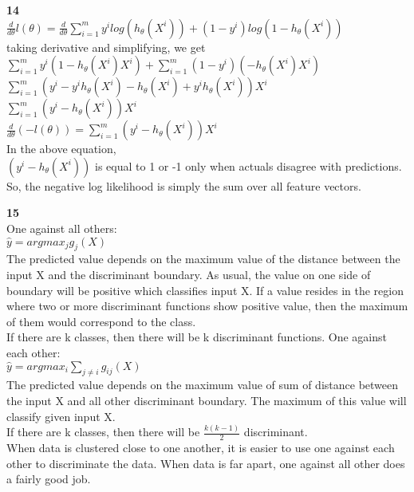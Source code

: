 \documentclass{article}
\begin{document}
\textbf{14}\bigskip \\
$\frac{d}{d\theta}l(\theta) = \frac{d}{d\theta}\sum_{i=1}^{m}y^{i}log(h_{\theta}(X^{i}))+(1-y^{i})log(1-h_{\theta}(X^{i}))$ \smallskip \\
taking derivative and simplifying, we get \smallskip \\
$\sum_{i=1}^{m}y^{i}(1-h_{\theta}(X^{i})X^{i})+\sum_{i=1}^{m}(1-y^{i})(-h_{\theta}(X^{i})X^{i})$\smallskip \\
$\sum_{i=1}^{m}(y^{i}-y^{i}h_{\theta}(X^{i})-h_{\theta}(X^{i})+y^{i}h_{\theta}(X^{i}))X^{i}$\smallskip \\
$\sum_{i=1}^{m}(y^{i}-h_{\theta}(X^{i}))X^{i}$\smallskip \\
$\frac{d}{d\theta}(-l(\theta))=\sum_{i=1}^{m}(y^{i}-h_{\theta}(X^{i}))X^{i}$ \bigskip \\
In the above equation, \\
$(y^{i}-h_{\theta}(X^{i}))$ is equal to 1 or -1 only when actuals disagree with predictions. So, the negative log likelihood is simply the sum over all feature vectors.

\textbf{15}\bigskip \\
One against all others:\smallskip \\
$\hat{y} = argmax_{j}g_{j}(X)$ \smallskip \\
The predicted value depends on the maximum value of the distance between the input X and the discriminant boundary. As usual, the value on one side of boundary will be positive which classifies input X. If a value resides in the region where two or more discriminant functions show positive value, then the maximum of them would correspond to the class. \smallskip \\
If there are k classes, then there will be k discriminant functions.
One against each other:\smallskip \\
$\hat{y} = argmax_{i}\sum_{j\neq i}g_{ij}(X)$\smallskip \\
The predicted value depends on the maximum value of sum of distance between the input X and all other discriminant boundary. The maximum of this value will classify given input X.\smallskip\\
If there are k classes, then there will be $\frac{k(k-1)}{2}$ discriminant.\smallskip\\
When data is clustered close to one another, it is easier to use one against each other to discriminate the data. When data is far apart, one against all other does a fairly good job.
\end{document}
